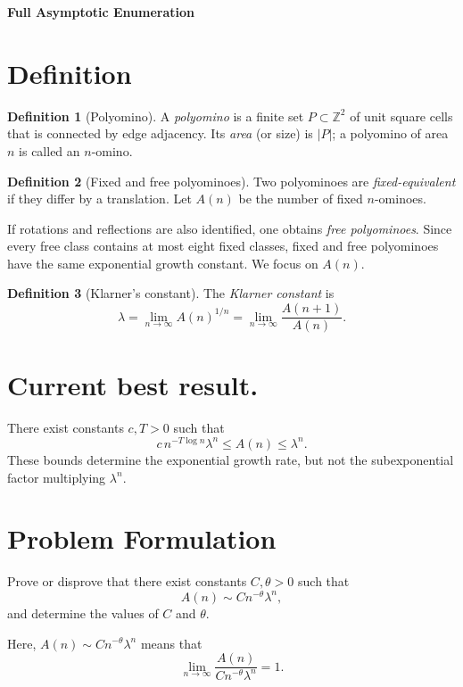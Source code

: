 \documentclass[11pt,a4paper]{article}
\theoremstyle{definition}
\newtheorem{definition}{Definition}
\newcommand{\A}{A}
\newcommand{\klarner}{\lambda}
\begin{document}
\begin{center}
  {\Large\bfseries Full Asymptotic Enumeration}
\end{center}
\section{Definition}
\begin{definition}[Polyomino]
A \emph{polyomino} is a finite set $P\subset \mathbb Z^2$ of unit square cells that is
connected by edge adjacency.  Its \emph{area} (or size) is $|P|$; a polyomino of
area $n$ is called an $n$-omino.
\end{definition}

\begin{definition}[Fixed and free polyominoes]
Two polyominoes are \emph{fixed-equivalent} if they differ by a translation.  Let
$\A(n)$ be the number of fixed $n$-ominoes.  
\end{definition}

If rotations and reflections are also
identified, one obtains \emph{free polyominoes}.  Since every free class contains at
most eight fixed classes, fixed and free polyominoes have the same exponential growth
constant.  We focus on $\A(n)$.

\begin{definition}[Klarner's constant]
The \emph{Klarner constant} is
\begin{equation}\label{eq:klarner}
 \klarner
 =\lim_{n\to\infty}\A(n)^{1/n}
 =\lim_{n\to\infty}\frac{\A(n+1)}{\A(n)}.
\end{equation}
\end{definition}

\section{Current best result.}
There exist constants $c,T>0$ such that
\begin{equation}
  c\,n^{-T\log n}\klarner^n
  \leq \A(n)
  \leq \klarner^n.
\end{equation}
These bounds determine the exponential growth rate, but not the subexponential
factor multiplying $\klarner^n$.

\section{Problem Formulation}

Prove or disprove that there exist constants $C,\theta>0$ such that
\begin{equation}
  \A(n)\sim Cn^{-\theta}\klarner^n,
\end{equation}
and determine the values of $C$ and $\theta$.

Here, $\A(n)\sim Cn^{-\theta}\klarner^n$ means that
\begin{equation}
  \lim_{n\to\infty}
  \frac{\A(n)}{Cn^{-\theta}\klarner^n}
  =1.
\end{equation}
\end{document}
